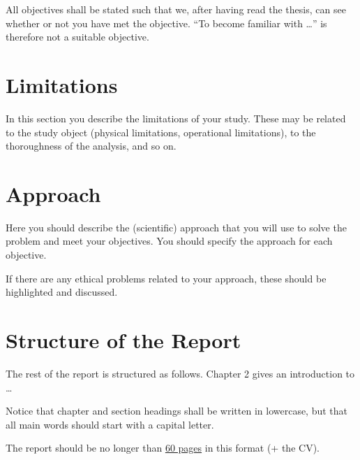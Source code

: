All objectives shall be stated such that we, after having read the thesis, can see whether or not you have met the objective. ``To become familiar with \ldots'' is therefore not a suitable objective.

\section{Limitations}
In this section you describe the limitations of your study. These may be related to the study object (physical limitations, operational limitations), to the thoroughness of the analysis, and so on.
\section{Approach}
Here you should describe the (scientific) approach that you will use to solve the problem and meet your objectives. You should specify the approach for each objective.

If there are any ethical problems related to your approach, these should be highlighted and discussed.
\section{Structure of the Report}
The rest of the report is structured as follows. Chapter 2 gives an introduction to \ldots

\begin{remark}
Notice that chapter and section headings shall be written in lowercase, but that all main words should start with a capital letter.
\end{remark}


The report should be no longer than \underline{60 pages} in this format (+ the CV).